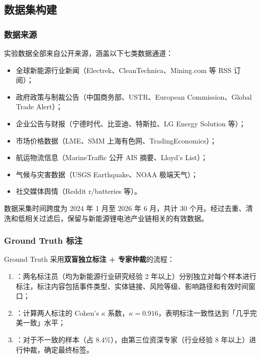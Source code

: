 \subsection{数据集构建}
\label{sec:exp-dataset}

\subsubsection{数据来源}

实验数据全部来自公开来源，涵盖以下七类数据通道：
\begin{itemize}
    \item 全球新能源行业新闻（Electrek、CleanTechnica、Mining.com 等 RSS 订阅）；
    \item 政府政策与制裁公告（中国商务部、USTR、European Commission、Global Trade Alert）；
    \item 企业公告与财报（宁德时代、比亚迪、特斯拉、LG Energy Solution 等）；
    \item 市场价格数据（LME、SMM 上海有色网、TradingEconomics）；
    \item 航运物流信息（MarineTraffic 公开 AIS 摘要、Lloyd's List）；
    \item 气候与灾害数据（USGS Earthquake、NOAA 极端天气）；
    \item 社交媒体舆情（Reddit r/batteries 等）。
\end{itemize}

数据采集时间跨度为 2024 年 1 月至 2026 年 6 月，共计 30 个月。经过去重、清洗和低相关过滤后，保留与新能源锂电池产业链相关的有效数据。

\subsubsection{Ground Truth 标注}

Ground Truth 采用\textbf{双盲独立标注 + 专家仲裁}的流程：
\begin{enumerate}
    \item {}：两名标注员（均为新能源行业研究经验 2 年以上）分别独立对每个样本进行标注，标注内容包括事件类型、实体链接、风险等级、影响路径和有效时间窗口；
    \item {}：计算两人标注的 Cohen's $\kappa$ 系数，$\kappa = 0.916$，表明标注一致性达到「几乎完美一致」水平；
    \item {}：对于不一致的样本（占 8.4\%），由第三位资深专家（行业经验 8 年以上）进行仲裁，确定最终标签。
\end{enumerate}


